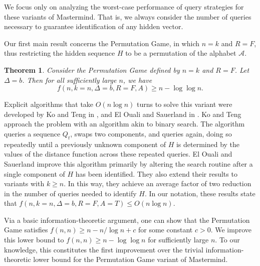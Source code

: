\documentclass[12pt, a4paper]{article}
\newtheorem{theorem}{Theorem}
\begin{document}
We focus only on analyzing the worst-case performance of query strategies for these variants of Mastermind. That is, we always consider the number of queries necessary to guarantee identification of any hidden vector.

Our first main result concerns the Permutation Game, in which $n=k$ and $R=F$, thus restricting the hidden sequence $H$ to be a permutation of the alphabet $\mathcal{A}$.
\begin{theorem}\label{permutationGameTheorem}
	 Consider the Permutation Game defined by $n = k$ and $R = F$. Let $\Delta = b$. Then for all sufficiently large $n$, we have	
 	\begin{equation*}
		f(n, k = n, \Delta = b, R = F, A) \ge n - \log\log n.
	\end{equation*}
\end{theorem}

Explicit algorithms that take $O(n \log n)$ turns to solve this variant were developed by Ko and Teng in \cite{KT86}, and El Ouali and Sauerland in \cite{OS13}. Ko and Teng approach the problem with an algorithm akin to binary search. The algorithm queries a sequence $Q_t$, swaps two components, and queries again, doing so repeatedly until a previously unknown component of $H$ is determined by the values of the distance function across these repeated queries. El Ouali and Sauerland improve this algorithm primarily by altering the search routine after a single component of $H$ has been identified. They also extend their results to variants with $k\ge n$. In this way, they achieve an average factor of two reduction in the number of queries needed to identify $H$. In our notation, these results state that $f(n, k=n, \Delta=b, R = F, A = T)\le O(n\log n)$.

Via a basic information-theoretic argument, one can show that the Permutation Game satisfies $f(n, n)\ge n - n/\log n + c$ for some constant $c>0$. We improve this lower bound to $f(n, n)\ge n- \log \log n$ for sufficiently large $n$. To our knowledge, this constitutes the first improvement over the trivial information-theoretic lower bound for the Permutation Game variant of Mastermind.
\end{document}
